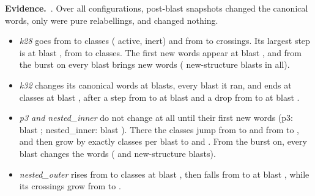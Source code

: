 \documentclass[11pt,a4paper]{article}
\newcommand{\evidence}{\par\smallskip\noindent\textbf{Evidence.}~}
\begin{document}
\evidence {}. Over all configurations,
\NumDeepStructureSteps{} post-blast snapshots changed the canonical words,
only \NumDeepRelabelSteps{} were pure relabellings, and
\NumDeepNoChangeSteps{} changed nothing.
\begin{itemize}[leftmargin=*]
\item \emph{k28} goes from \NumDeepClassesStartKTwoEight{} to
  \NumDeepClassesEndKTwoEight{} classes (\NumDeepActiveEndKTwoEight{} active,
  \NumDeepInertEndKTwoEight{} inert) and from
  \NumDeepCrossingsStartKTwoEight{} to \NumDeepCrossingsEndKTwoEight{}
  crossings. Its largest step is at blast \NumDeepJumpBlastKTwoEight, from
  \NumDeepJumpBeforeKTwoEight{} to \NumDeepJumpAfterKTwoEight{} classes. The
  first new words appear at blast \NumDeepFirstStructureKTwoEight, and from
  the burst on every blast brings new words
  (\NumDeepStructureChangesKTwoEight{} new-structure blasts in all).
\item \emph{k32} changes its canonical words at
  \NumDeepStructureChangesKThreeTwo{} blasts, every blast it ran, and ends
  at \NumDeepClassesEndKThreeTwo{} classes at blast
  \NumDeepClassesEndBlastKThreeTwo, after a step from
  \NumDeepJumpBeforeKThreeTwo{} to \NumDeepJumpAfterKThreeTwo{} at blast
  \NumDeepJumpBlastKThreeTwo{} and a drop from \NumDeepDropBeforeKThreeTwo{}
  to \NumDeepDropAfterKThreeTwo{} at blast \NumDeepDropBlastKThreeTwo.
\item \emph{p3 and nested\_inner} do not change at all until their first
  new words (p3: blast \NumDeepFirstStructurePThree; nested\_inner: blast
  \NumDeepFirstStructureNestedInner). There the
  classes jump from \NumDeepJumpBeforePThree{} to \NumDeepJumpAfterPThree{}
  and from \NumDeepJumpBeforeNestedInner{} to \NumDeepJumpAfterNestedInner,
  and then grow by exactly \NumDeepClassStepPThree{} classes per blast to
  \NumDeepClassesEndPThree{} and \NumDeepClassesEndNestedInner. From the
  burst on, every blast changes the words (\NumDeepStructureChangesPThree{}
  and \NumDeepStructureChangesNestedInner{} new-structure blasts).
\item \emph{nested\_outer} rises from \NumDeepClassesStartNestedOuter{} to
  \NumDeepJumpAfterNestedOuter{} classes at blast
  \NumDeepJumpBlastNestedOuter, then falls from
  \NumDeepDropBeforeNestedOuter{} to \NumDeepDropAfterNestedOuter{} at blast
  \NumDeepDropBlastNestedOuter, while its crossings grow from
  \NumDeepCrossingsStartNestedOuter{} to \NumDeepCrossingsEndNestedOuter.
\end{itemize}
\end{document}
